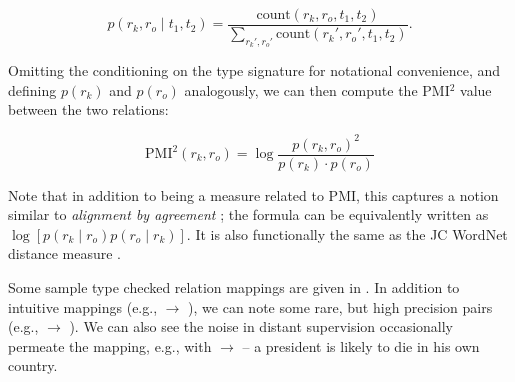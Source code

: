 \vspace{0.25cm}
\begin{equation*}
  p(r_k, r_o \mid t_1, t_2) = \frac{
    \textrm{count}(r_k, r_o,  t_1, t_2)
  }{
    \sum_{r_k', r_o'}\textrm{count}(r_k', r_o', t_1, t_2)
  }.
\end{equation*}
\vspace{0.25cm}

Omitting the conditioning on the type signature for notational convenience,
  and defining $p(r_k)$ and $p(r_o)$ analogously,
  we can then compute the PMI$^2$ value between the two relations:

\vspace{0.25cm}
\begin{equation*}
  \textrm{PMI}^2(r_k, r_o) = \log \frac{p(r_k, r_o)^2}{p(r_k) \cdot p(r_o)}
\end{equation*}
\vspace{0.25cm}

\noindent Note that in addition to being a measure related to PMI, this captures
  a notion similar to \textit{alignment by agreement} 
  \cite{key:2006liang-alignment};
  the formula can be equivalently written as 
  $\log \left[ p(r_k \mid r_o) p(r_o \mid r_k)\right]$.
It is also functionally the same as the JC WordNet distance measure
  \cite{key:1997jc-similarity}.

Some sample type checked relation mappings are given in .
In addition to intuitive mappings (e.g.,  $\rightarrow$ 
  ), we can note some rare, but high precision pairs
  (e.g.,  $\rightarrow$ ).
We can also see the noise in distant supervision occasionally permeate 
  the mapping, e.g., with  $\rightarrow$ 
  -- a president is likely to die in his own country.


  


